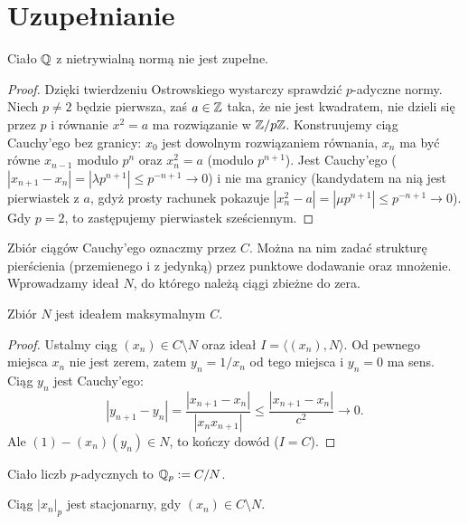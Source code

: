 \section{Uzupełnianie}

\begin{lemat}
	Ciało $\mathbb{Q}$ z nietrywialną normą nie jest zupełne.
\end{lemat}

\begin{proof}
	Dzięki twierdzeniu Ostrowskiego wystarczy sprawdzić $p$-adyczne normy.
	Niech $p \neq 2$ będzie pierwsza, zaś $a \in \mathbb{Z}$ taka, że nie jest kwadratem, nie dzieli się przez $p$ i równanie $x^2 = a$ ma rozwiązanie w $\mathbb{Z}/p\mathbb{Z}$.
	Konstruujemy ciąg Cauchy'ego bez granicy: $x_0$ jest dowolnym rozwiązaniem równania, $x_n$ ma być równe $x_{n-1}$ modulo $p^n$ oraz $x_n^2 = a$ (modulo $p^{n+1}$).
	Jest Cauchy'ego ($|x_{n+1} - x_n| = |\lambda p^{n+1}| \le p^{-n+1} \to 0$) i nie ma granicy (kandydatem na nią jest pierwiastek z $a$, gdyż prosty rachunek pokazuje $|x_n^2 - a| = |\mu p^{n+1}| \le p^{-n+1} \to 0$).
	Gdy $p = 2$, to zastępujemy pierwiastek  sześciennym.
\end{proof}

Zbiór ciągów Cauchy'ego oznaczmy przez $C$.
Można na nim zadać strukturę pierścienia (przemienego i z jedynką) przez punktowe dodawanie oraz mnożenie.
Wprowadzamy ideał $N$, do którego należą ciągi zbieżne do zera.

\begin{lemat}
	Zbiór $N$ jest ideałem maksymalnym $C$.
\end{lemat}

\begin{proof}
Ustalmy ciąg $(x_n) \in C \setminus N$ oraz ideał $I = \langle (x_n), N \rangle$.
Od pewnego miejsca $x_n$ nie jest zerem, zatem $y_n = 1/x_n$ od tego miejsca i $y_n = 0$ ma sens.
Ciąg $y_n$ jest Cauchy'ego:
\[
	|y_{n+1} - y_n| = \frac{|x_{n+1} - x_n|}{|x_nx_{n+1}|} \le \frac{|x_{n+1}-x_n|}{c^2} \to 0.
\]
Ale $(1) - (x_n)(y_n) \in N$, to kończy dowód ($I = C$).
\end{proof}

\begin{definicja}
	Ciało liczb $p$-adycznych to $\mathbb{Q}_p := C  / N$.
\end{definicja}

\begin{lemat}
	Ciąg $|x_n|_p$ jest stacjonarny, gdy $(x_n) \in C \setminus N$.
\end{lemat}

